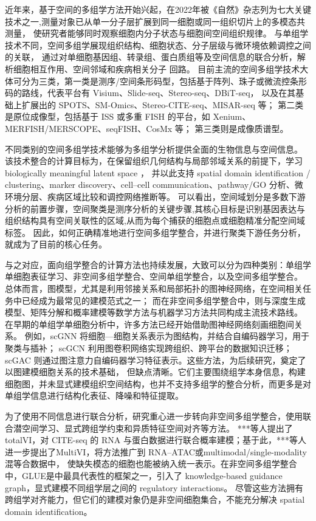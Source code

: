 \documentclass[journal]{IEEEtran}
\begin{document}
近年来，基于空间的多组学方法开始兴起，在2022年被《自然》杂志列为七大关键技术之一,测量对象已从单一分子层扩展到同一细胞或同一组织切片上的多模态共测量，
使研究者能够同时观察细胞内分子状态与细胞间空间组织规律。
与单组学技术不同，空间多组学展现组织结构、细胞状态、分子层级与微环境依赖调控之间的关联，
通过对单细胞基因组、转录组、蛋白质组等及空间信息的联合分析，解析细胞相互作用、空间邻域和疾病相关分子
回路。
目前主流的空间多组学技术大体可分为三类，第一类是测序/空间条形码型，包括基于阵列、珠子或微流控条形码的路线，代表平台有 Visium、Slide-seq、Stereo-seq、DBiT-seq，
以及在其基础上扩展出的 SPOTS、SM-Omics、Stereo-CITE-seq、MISAR-seq 等；
第二类是原位成像型，包括基于 ISS 或多重 FISH 的平台，如 Xenium、MERFISH/MERSCOPE、seqFISH、CosMx 等；
第三类则是成像质谱型。

不同类别的空间多组学技术能够为多组学分析提供全面的生物信息与空间信息。
该技术整合的计算目标为，在保留组织几何结构与局部邻域关系的前提下，学习 biologically meaningful latent space ，
并以此支持 spatial domain identification / clustering、marker discovery、cell–cell communication、pathway/GO 分析、微环境分层、疾病区域比较和调控网络推断等。
 可以看出，空间域划分是多数下游分析的前置步骤，空间聚类是测序分析的关键步骤,其核心目标是识别基因表达与组织结构具有空间关联性的区域,从而为每个捕获的细胞点或细胞精准分配空间域标签。
因此，如何正确精准地进行空间多组学整合，并进行聚类下游任务分析，就成为了目前的核心任务。

与之对应，面向组学整合的计算方法也持续发展，大致可以分为四种类别：单组学单细胞表征学习、非空间多组学整合、空间单组学整合，以及空间多组学整合。
总体而言，图模型，尤其是利用邻接关系和局部拓扑的图神经网络，在空间相关任务中已经成为最常见的建模范式之一；
而在非空间多组学整合中，则与深度生成模型、矩阵分解和概率建模等数学方法与机器学习方法共同构成主流技术路线。
在早期的单组学单细胞分析中，许多方法已经开始借助图神经网络刻画细胞间关系。
例如，scGNN 将细胞—细胞关系表示为图结构，并结合自编码器学习，用于聚类与插补；
scGCN 利用图卷积网络实现跨组织、跨平台的数据知识迁移；scGAC 则通过图注意力自编码器学习特征表示。这些方法，为后续研究，奠定了以图建模细胞关系的技术基础，
但缺点清晰。它们主要围绕组学本身信息，构建细胞图，并未显式建模组织空间结构，也并不支持多组学的整合分析，而更多是对单组学信息进行结构化表征、降噪和特征提取。

为了使用不同信息进行联合分析，研究重心进一步转向非空间多组学整合，使用联合潜空间学习、显式跨组学约束和异质特征空间对齐等方法。
***等人提出了totalVI，对 CITE-seq 的 RNA 与蛋白数据进行联合概率建模；基于此，***等人进一步提出了MultiVI，将方法推广到 RNA–ATAC或multimodal/single-modality 混等合数据中，
使缺失模态的细胞也能被纳入统一表示。在非空间多组学整合中，GLUE是中最具代表性的框架之一，引入了 knowledge-based guidance graph，显式建模不同组学层之间的 regulatory interactions。
尽管这些方法拥有跨组学对齐能力，但它们的建模对象仍是非空间细胞集合，不能充分解决 spatial domain identification。
\end{document}

